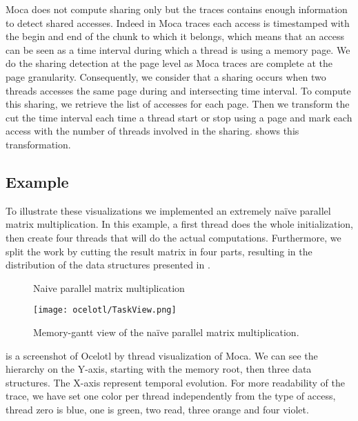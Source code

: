 \gls{Moca} does not compute sharing only but the traces contains enough information to detect shared accesses.
Indeed in \gls{Moca} traces each access is timestamped with the begin and end of the chunk to which it belongs, which means that an access can be seen as a time interval during which a thread is using a memory page.
We do the sharing detection at the page level as \gls{Moca} traces are complete at the page granularity.
Consequently, we consider that a sharing occurs when two threads accesses the same page during and intersecting time interval.
To compute this sharing, we retrieve the list of accesses for each page.
Then we transform the cut the time interval each time a thread start or stop using a page and mark each access with the number of threads involved in the sharing.
 shows this transformation.

\subsection{Example}

To illustrate these visualizations we implemented an extremely naïve parallel matrix multiplication.
In this example, a first thread does the whole initialization, then create four threads that will do the actual computations.
Furthermore, we split the work by cutting the result matrix in four parts, resulting in the distribution of the data structures presented in .

\begin{figure}[htb]
    \centering
    
    \caption{Naive parallel matrix multiplication}
    \label{fig:mat-mult-par}
\end{figure}

\begin{figure}[htb]
    \centering
    \texttt{[image: ocelotl/TaskView.png]}
    \caption{Memory-gantt view of the naïve parallel matrix multiplication.}
    \label{fig:ocelotl-th0}
\end{figure}

 is a screenshot of \gls{Ocelotl} by thread visualization of \gls{Moca}.
We can see the hierarchy on the Y-axis, starting with the memory root, then three data structures.
The X-axis represent temporal evolution.
For more readability of the trace, we have set one color per thread independently from the type of access, thread zero is blue, one is green, two read, three orange and four violet.

